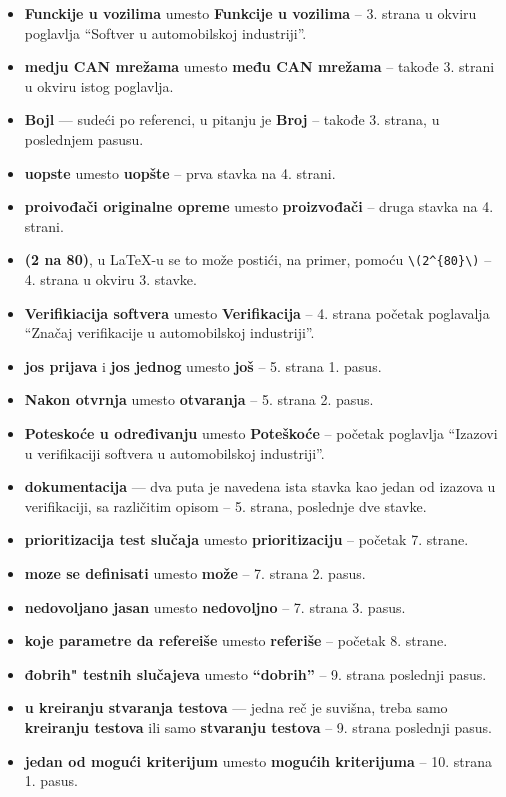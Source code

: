 \documentclass[a4paper]{report}
\begin{document}
\begin{itemize}
\item{\bf Funckije u vozilima} umesto {\bf{Funkcije u vozilima}} -- 3. strana u okviru poglavlja ``Softver u automobilskoj industriji''.
\item {\bf{medju CAN mrežama}} umesto {\bf{među CAN mrežama}} -- takođe 3. strani u okviru istog poglavlja.
\item {\bf{Bojl}} --- sudeći po referenci, u pitanju je {\bf{Broj}} -- takođe 3. strana, u poslednjem pasusu.
\item {\bf{uopste}} umesto {\bf{uopšte}} -- prva stavka na 4. strani.
\item {\bf{proivođači originalne opreme}} umesto {\bf{proizvođači}} -- druga stavka na 4. strani.
\item {\bf{(2 na 80)}}, u \LaTeX -u se to može postići, na primer, pomoću \verb|\(2^{80}\)| -- 4. strana u okviru 3. stavke.
\item {\bf{Verifikiacija softvera}} umesto {\bf{Verifikacija}} -- 4. strana početak poglavalja ``Značaj verifikacije u automobilskoj industriji''.
\item {\bf{jos prijava}} i {\bf{jos jednog}} umesto {\bf{još}} -- 5. strana 1. pasus.
\item {\bf{Nakon otvrnja}} umesto {\bf{otvaranja}} -- 5. strana 2. pasus.
\item {\bf{Poteskoće u određivanju}} umesto {\bf{Poteškoće}} -- početak poglavlja ``Izazovi u verifikaciji softvera u automobilskoj industriji''.
\item {\bf{dokumentacija}} --- dva puta je navedena ista stavka kao jedan od izazova u verifikaciji, sa različitim opisom -- 5. strana, poslednje dve stavke.
\item {\bf{prioritizacija test slučaja}} umesto {\bf{prioritizaciju}} -- početak 7. strane.
\item {\bf{moze se definisati}} umesto {\bf{može}} -- 7. strana 2. pasus.
\item {\bf{nedovoljano jasan}} umesto {\bf{nedovoljno}} -- 7. strana 3. pasus.
\item {\bf{koje parametre da refereiše}} umesto {\bf{referiše}} -- početak 8. strane.
\item {\bf{đobrih" testnih slučajeva}} umesto {\bf{``dobrih''}} -- 9. strana poslednji pasus.
\item {\bf{u kreiranju stvaranja testova}} --- jedna reč je suvišna, treba samo {\bf{kreiranju testova}} ili samo {\bf{stvaranju testova}} -- 9. strana poslednji pasus.
\item {\bf{jedan od mogući kriterijum}} umesto {\bf{mogućih kriterijuma}} -- 10. strana 1. pasus.

\end{itemize}
\end{document}
